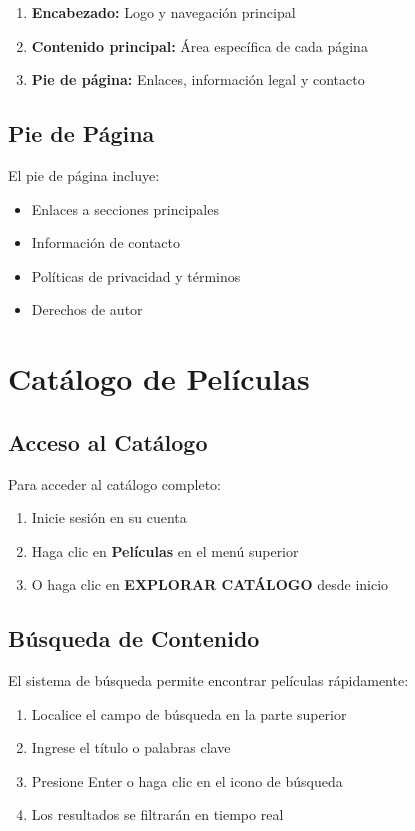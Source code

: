 \documentclass[11pt,a4paper,twoside]{book}
\begin{document}
\begin{enumerate}
    \item \textbf{Encabezado:} Logo y navegación principal
    \item \textbf{Contenido principal:} Área específica de cada página
    \item \textbf{Pie de página:} Enlaces, información legal y contacto
\end{enumerate}

\section{Pie de Página}

El pie de página incluye:
\begin{itemize}
    \item Enlaces a secciones principales
    \item Información de contacto
    \item Políticas de privacidad y términos
    \item Derechos de autor
\end{itemize}

\chapter{Catálogo de Películas}

\section{Acceso al Catálogo}

Para acceder al catálogo completo:
\begin{enumerate}
    \item Inicie sesión en su cuenta
    \item Haga clic en \textbf{Películas} en el menú superior
    \item O haga clic en \textbf{EXPLORAR CATÁLOGO} desde inicio
\end{enumerate}

\section{Búsqueda de Contenido}

El sistema de búsqueda permite encontrar películas rápidamente:

\begin{enumerate}
    \item Localice el campo de búsqueda en la parte superior
    \item Ingrese el título o palabras clave
    \item Presione Enter o haga clic en el icono de búsqueda
    \item Los resultados se filtrarán en tiempo real
\end{enumerate}
\end{document}
